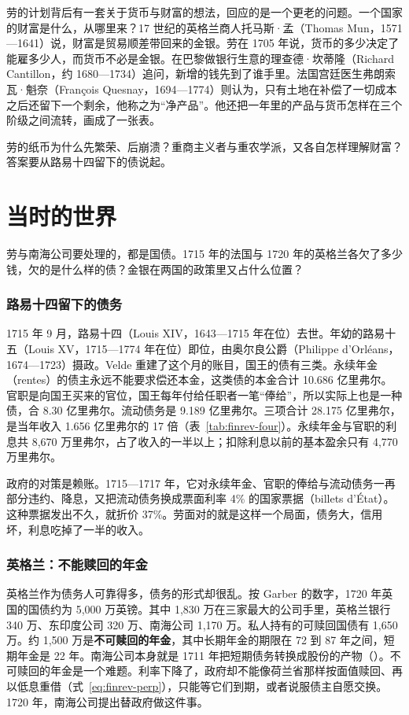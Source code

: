 劳的计划背后有一套关于货币与财富的想法，回应的是一个更老的问题。一个国家的财富是什么，从哪里来？17 世纪的英格兰商人托马斯·孟（Thomas Mun，1571—1641）说，财富是贸易顺差带回来的金银。劳在 1705 年说，货币的多少决定了能雇多少人，而货币不必是金银。在巴黎做银行生意的理查德·坎蒂隆（Richard Cantillon，约 1680—1734）追问，新增的钱先到了谁手里。法国宫廷医生弗朗索瓦·魁奈（François Quesnay，1694—1774）则认为，只有土地在补偿了一切成本之后还留下一个剩余，他称之为“净产品”。他还把一年里的产品与货币怎样在三个阶级之间流转，画成了一张表。

劳的纸币为什么先繁荣、后崩溃？重商主义者与重农学派，又各自怎样理解财富？答案要从路易十四留下的债说起。

\section{当时的世界}\label{sec:merc-world}

劳与南海公司要处理的，都是国债。1715 年的法国与 1720 年的英格兰各欠了多少钱，欠的是什么样的债？金银在两国的政策里又占什么位置？

\subsubsection{路易十四留下的债务}
1715 年 9 月，路易十四（Louis XIV，1643—1715 年在位）去世。年幼的路易十五（Louis XV，1715—1774 年在位）即位，由奥尔良公爵（Philippe d'Orléans，1674—1723）摄政。Velde 重建了这个月的账目，国王的债有三类。永续年金（rentes）的债主永远不能要求偿还本金，这类债的本金合计 10.686 亿里弗尔。官职是向国王买来的官位，国王每年付给任职者一笔“俸给”，所以实际上也是一种债，合 8.30 亿里弗尔。流动债务是 9.189 亿里弗尔。三项合计 28.175 亿里弗尔，是当年收入 1.656 亿里弗尔的 17 倍（表~\ref{tab:finrev-four}）。永续年金与官职的利息共 8,670 万里弗尔，占了收入的一半以上；扣除利息以前的基本盈余只有 4,770 万里弗尔\cite{velde2003}。

政府的对策是赖账。1715—1717 年，它对永续年金、官职的俸给与流动债务一再部分违约、降息，又把流动债务换成票面利率 4\% 的国家票据（billets d'État）。这种票据发出不久，就折价 37\%\cite{velde2003}。劳面对的就是这样一个局面，债务大，信用坏，利息吃掉了一半的收入。

\subsubsection{英格兰：不能赎回的年金}
英格兰作为债务人可靠得多，债务的形式却很乱。按 Garber 的数字，1720 年英国的国债约为 5,000 万英镑。其中 1,830 万在三家最大的公司手里，英格兰银行 340 万、东印度公司 320 万、南海公司 1,170 万。私人持有的可赎回国债有 1,650 万。约 1,500 万是\textbf{不可赎回的年金}，其中长期年金的期限在 72 到 87 年之间，短期年金是 22 年\cite{garber1990}。南海公司本身就是 1711 年把短期债务转换成股份的产物（）。不可赎回的年金是一个难题。利率下降了，政府却不能像荷兰省那样按面值赎回、再以低息重借（式~\eqref{eq:finrev-perp}），只能等它们到期，或者说服债主自愿交换。1720 年，南海公司提出替政府做这件事。


